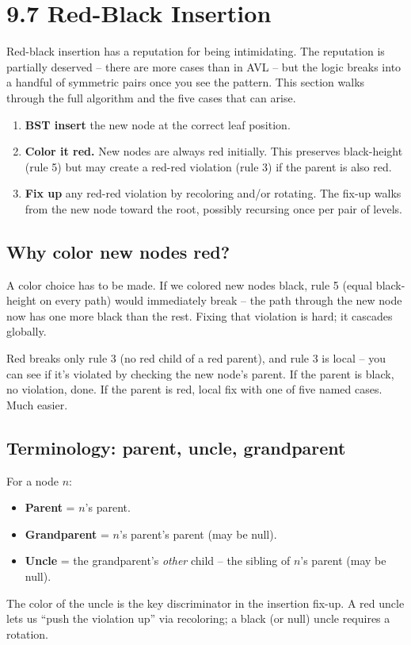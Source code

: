 \documentclass[11pt]{article}
\begin{document}
\section{9.7 Red-Black Insertion}

Red-black insertion has a reputation for being intimidating. The reputation is partially deserved -- there are more cases than in AVL -- but the logic breaks into a handful of symmetric pairs once you see the pattern. This section walks through the full algorithm and the five cases that can arise.

\begin{defnbox}
\begin{enumerate}[leftmargin=*]
    \item \textbf{BST insert} the new node at the correct leaf position.
    \item \textbf{Color it red.} New nodes are always red initially. This preserves black-height (rule 5) but may create a red-red violation (rule 3) if the parent is also red.
    \item \textbf{Fix up} any red-red violation by recoloring and/or rotating. The fix-up walks from the new node toward the root, possibly recursing once per pair of levels.
\end{enumerate}
\end{defnbox}

\subsection*{Why color new nodes red?}

A color choice has to be made. If we colored new nodes black, rule 5 (equal black-height on every path) would immediately break -- the path through the new node now has one more black than the rest. Fixing that violation is hard; it cascades globally.

Red breaks only rule 3 (no red child of a red parent), and rule 3 is local -- you can see if it's violated by checking the new node's parent. If the parent is black, no violation, done. If the parent is red, local fix with one of five named cases. Much easier.

\subsection*{Terminology: parent, uncle, grandparent}

\begin{defnbox}
For a node $n$:
\begin{itemize}[leftmargin=*]
    \item \textbf{Parent} = $n$'s parent.
    \item \textbf{Grandparent} = $n$'s parent's parent (may be null).
    \item \textbf{Uncle} = the grandparent's \emph{other} child -- the sibling of $n$'s parent (may be null).
\end{itemize}
The color of the uncle is the key discriminator in the insertion fix-up. A red uncle lets us ``push the violation up'' via recoloring; a black (or null) uncle requires a rotation.
\end{defnbox}
\end{document}
